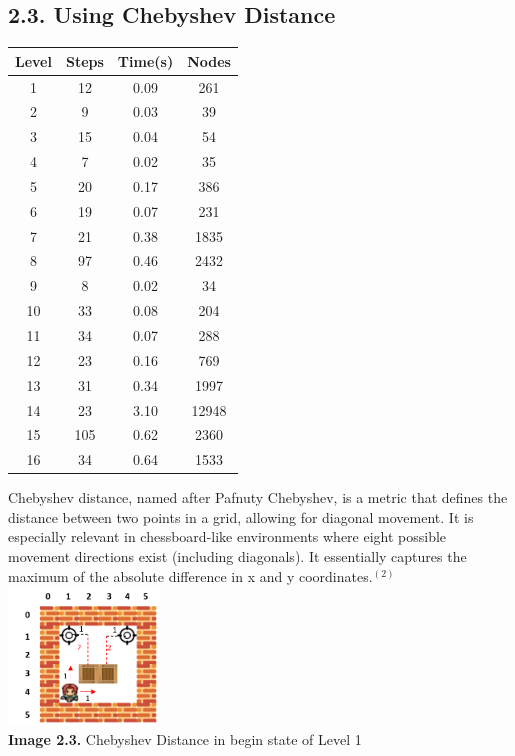 \documentclass[english, a4paper,12pt]{article}
\begin{document}
\subsection*{2.3. Using Chebyshev Distance}
\begin{minipage}{.35\textwidth}
\begin{tabular}{|c|c|c|c|}
\hline
Level & Steps & Time(s) & Nodes \\
\hline
1 & 12 & 0.09 & 261 \\
2 & 9 & 0.03 & 39 \\
3 & 15 & 0.04 & 54 \\
4 & 7 & 0.02 & 35 \\
5 & 20 & 0.17 & 386 \\
6 & 19 & 0.07 & 231 \\
7 & 21 & 0.38 & 1835 \\
8 & 97 & 0.46 & 2432 \\
9 & 8 & 0.02 & 34 \\
10 & 33 & 0.08 & 204 \\
11 & 34 & 0.07 & 288 \\
12 & 23 & 0.16 & 769 \\
13 & 31 & 0.34 & 1997 \\
14 & 23 & 3.10 & 12948 \\
15 & 105 & 0.62 & 2360 \\
16 & 34 & 0.64 & 1533 \\
\hline
\end{tabular}
\end{minipage}
\begin{minipage}{.7\textwidth}
Chebyshev distance, named  after  Pafnuty  Chebyshev, is a  metric  that defines  the  distance between  two  points in  a grid,  allowing  for  diagonal  movement.  It  is  especially relevant  in  chessboard-like  environments  where  eight possible movement directions exist (including diagonals). It essentially captures the maximum of the absolute difference in x and y coordinates.$^{(2)}$\\
\hspace*{35mm}\includegraphics[width=4cm]{Level1_CHE.png}\\
\hspace*{10mm}\textbf{Image 2.3. } Chebyshev Distance in begin state of Level 1
\end{minipage}
\end{document}
